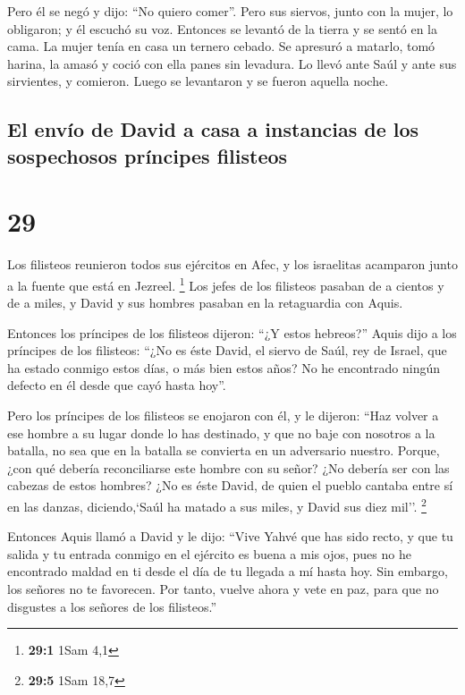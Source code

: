  Pero él se negó y dijo: ``No quiero comer''. Pero sus
siervos, junto con la mujer, lo obligaron; y él escuchó su voz. Entonces
se levantó de la tierra y se sentó en la cama.  La mujer
tenía en casa un ternero cebado. Se apresuró a matarlo, tomó harina, la
amasó y coció con ella panes sin levadura.  Lo llevó ante
Saúl y ante sus sirvientes, y comieron. Luego se levantaron y se fueron
aquella noche.

\hypertarget{el-envuxedo-de-david-a-casa-a-instancias-de-los-sospechosos-pruxedncipes-filisteos}{%
\subsection{El envío de David a casa a instancias de los sospechosos
príncipes
filisteos}\label{el-envuxedo-de-david-a-casa-a-instancias-de-los-sospechosos-pruxedncipes-filisteos}}

\hypertarget{section-28}{%
\section{29}\label{section-28}}

 Los filisteos reunieron todos sus ejércitos en Afec, y
los israelitas acamparon junto a la fuente que está en Jezreel.
\footnote{\textbf{29:1} 1Sam 4,1}  Los jefes de los
filisteos pasaban de a cientos y de a miles, y David y sus hombres
pasaban en la retaguardia con Aquis.

 Entonces los príncipes de los filisteos dijeron: ``¿Y
estos hebreos?'' Aquis dijo a los príncipes de los filisteos: ``¿No es
éste David, el siervo de Saúl, rey de Israel, que ha estado conmigo
estos días, o más bien estos años? No he encontrado ningún defecto en él
desde que cayó hasta hoy''.

 Pero los príncipes de los filisteos se enojaron con él, y
le dijeron: ``Haz volver a ese hombre a su lugar donde lo has destinado,
y que no baje con nosotros a la batalla, no sea que en la batalla se
convierta en un adversario nuestro. Porque, ¿con qué debería
reconciliarse este hombre con su señor? ¿No debería ser con las cabezas
de estos hombres?  ¿No es éste David, de quien el pueblo
cantaba entre sí en las danzas, diciendo,`Saúl ha matado a sus miles, y
David sus diez mil''. \footnote{\textbf{29:5} 1Sam 18,7}

 Entonces Aquis llamó a David y le dijo: ``Vive Yahvé que
has sido recto, y que tu salida y tu entrada conmigo en el ejército es
buena a mis ojos, pues no he encontrado maldad en ti desde el día de tu
llegada a mí hasta hoy. Sin embargo, los señores no te favorecen.
 Por tanto, vuelve ahora y vete en paz, para que no
disgustes a los señores de los filisteos.''

